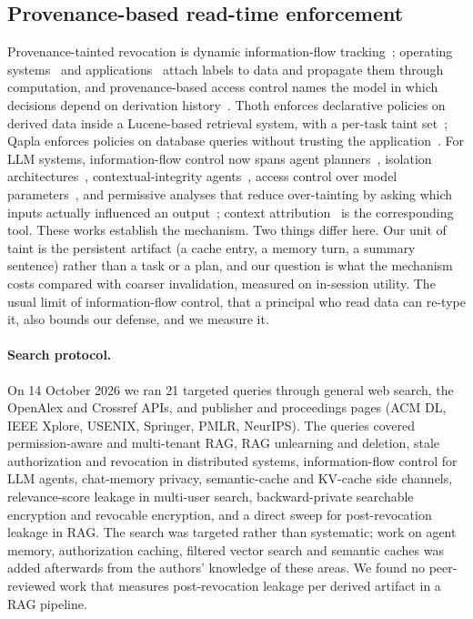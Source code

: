 \subsection{Provenance-based read-time enforcement}
Provenance-tainted revocation is dynamic information-flow tracking~\cite{myers1997decentralized,sabelfeld2003language};
operating systems~\cite{zeldovich2006making,krohn2007information} and applications~\cite{yip2009improving,enck2010taintdroid}
attach labels to data and propagate them through computation, and provenance-based access control
names the model in which decisions depend on derivation history~\cite{park2012pbac,buneman2001why}.
Thoth enforces declarative policies on derived data inside a Lucene-based retrieval system, with a
per-task taint set~\cite{elnikety2016thoth}; Qapla enforces policies on database queries without
trusting the application~\cite{mehta2017qapla}. For LLM systems, information-flow control now spans
agent planners~\cite{costa2026fides,debenedetti2025camel,wu2024fsecure,zhong2025rtbas}, isolation
architectures~\cite{wu2025isolategpt}, contextual-integrity agents~\cite{bagdasarian2024airgap},
access control over model parameters~\cite{tiwari2024ifc,jayaraman2025permissioned}, and permissive
analyses that reduce over-tainting by asking which inputs actually influenced an
output~\cite{siddiqui2024permissive}; context attribution~\cite{cohenwang2024contextcite} is the
corresponding tool. These works establish the mechanism. Two things differ here. Our unit of taint
is the persistent artifact (a cache entry, a memory turn, a summary sentence) rather than a task or
a plan, and our question is what the mechanism costs compared with coarser invalidation, measured
on in-session utility. The usual limit of information-flow control, that a principal who read data
can re-type it, also bounds our defense, and we measure it.

\paragraph{Search protocol.}
On 14 October 2026 we ran 21 targeted queries through general web search, the OpenAlex and Crossref
APIs, and publisher and proceedings pages (ACM DL, IEEE Xplore, USENIX, Springer, PMLR, NeurIPS). The
queries covered permission-aware and multi-tenant RAG, RAG unlearning and deletion, stale authorization
and revocation in distributed systems, information-flow control for LLM agents, chat-memory privacy,
semantic-cache and KV-cache side channels, relevance-score leakage in multi-user search, backward-private
searchable encryption and revocable encryption, and a direct sweep for post-revocation leakage in RAG.
The search was targeted rather than systematic; work on agent memory, authorization caching, filtered
vector search and semantic caches was added afterwards from the authors' knowledge of these areas. We
found no peer-reviewed work that measures post-revocation leakage per derived artifact in a RAG pipeline.
